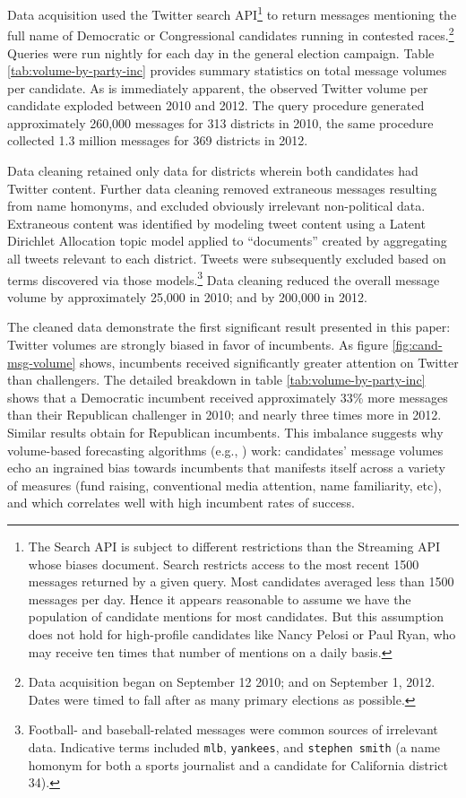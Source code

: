 \documentclass{article}
\begin{document}
Data acquisition used the Twitter search API\footnote{The Search API
  is subject to different restrictions than the Streaming API whose
  biases \cite{morstatter2013sample} document. Search restricts access
to the most recent 1500 messages returned by a given query. Most
candidates averaged less than 1500 messages per day. Hence it appears
reasonable to assume we have the population of candidate mentions for
most candidates. But this assumption does not hold for high-profile
candidates like Nancy Pelosi or Paul Ryan, who may receive ten times
that number of mentions on a daily basis.} to return messages
mentioning the full name of Democratic or Congressional candidates
running in contested races.\footnote{Data acquisition began on September 12
2010; and on September 1, 2012. Dates were timed to fall after as many
primary elections as possible.} Queries were run nightly for each day
in the general election campaign. Table
\ref{tab:volume-by-party-inc} provides summary statistics on total
message volumes per candidate. As is immediately apparent, the observed
Twitter volume per candidate exploded between 2010 and 2012. The query
procedure generated approximately 260,000 messages for 313 districts
in 2010, the same procedure collected 1.3 million messages for 369
districts in 2012.  %

Data cleaning retained only
data for districts wherein both candidates had Twitter
content. Further data cleaning removed extraneous messages resulting
from name homonyms, and excluded obviously irrelevant non-political
data. Extraneous content was identified by modeling tweet content
using a Latent Dirichlet Allocation topic model applied to
``documents'' created by aggregating all tweets relevant to each
district. Tweets were subsequently excluded based on terms discovered
via those models.\footnote{Football- and baseball-related messages were
  common sources of irrelevant data. Indicative terms included
  \texttt{mlb}, \texttt{yankees}, and \texttt{stephen smith} (a name
  homonym for both a sports journalist and a candidate for California
  district 34).} Data cleaning reduced the overall message volume
by approximately 25,000 in 2010; and by 200,000 in 2012.

The cleaned data demonstrate the first significant result presented in
this paper: Twitter volumes are strongly biased in favor of
incumbents. As figure \ref{fig:cand-msg-volume} shows, incumbents
received significantly greater attention on Twitter than challengers.
The detailed breakdown in table \ref{tab:volume-by-party-inc} shows
that a Democratic incumbent received approximately 33\% more messages
than their Republican challenger in 2010; and nearly three times more
in 2012. Similar results obtain for Republican incumbents. This
imbalance suggests why volume-based forecasting algorithms (e.g.,
\cite{digrazia2013,tumasjan2010election,bermingham2011using}) work:
candidates' message volumes echo an ingrained bias towards incumbents
that manifests itself across a variety of measures (fund raising,
conventional media attention, name familiarity, etc), and which
correlates well with high incumbent rates of success. 
\end{document}
